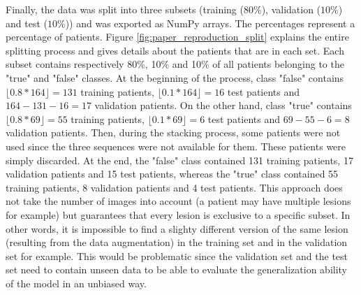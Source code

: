 Finally, the data was split into three subsets (training ($80$\%), validation ($10$\%) and test ($10$\%)) and was exported as NumPy arrays. The percentages represent a percentage of patients. Figure \ref{fig:paper_reproduction_split} explains the entire splitting process and gives details about the patients that are in each set. Each subset contains respectively 80\%, 10\% and 10\% of all patients belonging to the "true" and "false" classes. At the beginning of the process, class "false" contains $\lfloor 0.8 * 164 \rfloor = 131$ training patients, $\lfloor 0.1 * 164 \rfloor = 16$ test patients and $164 - 131 - 16 = 17$ validation patients. On the other hand, class "true" contains $\lfloor 0.8 * 69 \rfloor = 55$ training patients, $\lfloor 0.1 * 69 \rfloor = 6$ test patients and $69 - 55 - 6 = 8$ validation patients. Then, during the stacking process, some patients were not used since the three sequences were not available for them. These patients were simply discarded. At the end, the "false" class contained 131 training patients, 17 validation patients and 15 test patients, whereas the "true" class contained 55 training patients, 8 validation patients and 4 test patients. This approach does not take the number of images into account (a patient may have multiple lesions for example) but guarantees that every lesion is exclusive to a specific subset. In other words, it is impossible to find a slighty different version of the same lesion (resulting from the data augmentation) in the training set and in the validation set for example. This would be problematic since the validation set and the test set need to contain unseen data to be able to evaluate the generalization ability of the model in an unbiased way. 

